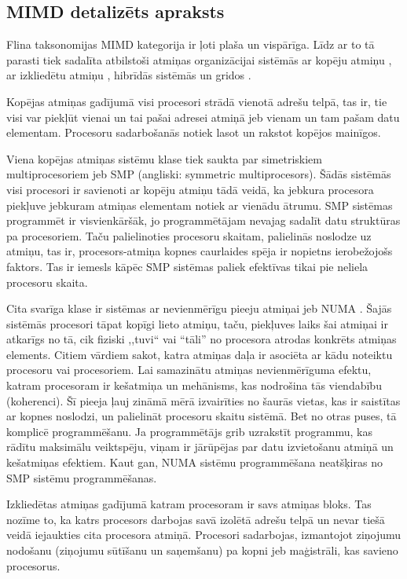 \subsection{MIMD detalizēts apraksts}
Flina taksonomijas MIMD kategorija ir ļoti plaša un vispārīga. Līdz ar to tā
parasti tiek sadalīta atbilstoši atmiņas organizācijai sistēmās ar kopēju atmiņu
, ar izkliedētu atmiņu , hibrīdās
sistēmās un gridos \cite{IntParComp, PatParProg}.

Kopējas atmiņas gadījumā visi procesori strādā vienotā adrešu telpā, tas ir, tie
visi var piekļūt vienai un tai pašai adresei atmiņā jeb vienam un tam pašam datu
elementam. Procesoru sadarbošanās notiek lasot un rakstot kopējos mainīgos.

Viena kopējas atmiņas sistēmu klase tiek saukta par simetriskiem multiprocesoriem
jeb SMP (angliski: symmetric multiprocesors). Šādās sistēmās visi procesori ir
savienoti ar kopēju atmiņu tādā veidā, ka jebkura procesora piekļuve jebkuram
atmiņas elementam notiek ar vienādu ātrumu. SMP sistēmas programmēt ir visvienkāršāk,
jo programmētājam nevajag sadalīt datu struktūras pa procesoriem. Taču palielinoties
procesoru skaitam, palielinās noslodze uz atmiņu, tas ir, procesors-atmiņa kopnes
caurlaides spēja ir nopietns ierobežojošs faktors. Tas ir iemesls kāpēc SMP sistēmas
paliek efektīvas tikai pie neliela procesoru skaita.

Cita svarīga klase ir sistēmas ar nevienmērīgu pieeju atmiņai jeb NUMA . Šajās sistēmās procesori tāpat kopīgi lieto atmiņu, taču,
piekļuves laiks šai atmiņai ir atkarīgs no tā, cik fiziski ,,tuvi`` vai “tāli” no
procesora atrodas konkrēts atmiņas elements. Citiem vārdiem sakot, katra atmiņas
daļa ir asociēta ar kādu noteiktu procesoru vai procesoriem. Lai samazinātu atmiņas
nevienmērīguma efektu, katram procesoram ir kešatmiņa un mehānisms, kas nodrošina
tās viendabību (koherenci). Šī pieeja ļauj zināmā mērā izvairīties no šaurās vietas,
kas ir saistītas ar kopnes noslodzi, un palielināt procesoru skaitu sistēmā. Bet
no otras puses, tā komplicē programmēšanu. Ja programmētājs grib uzrakstīt programmu,
kas rādītu maksimālu veiktspēju, viņam ir jārūpējas par datu izvietošanu atmiņā
un kešatmiņas efektiem. Kaut gan, NUMA sistēmu programmēšana neatšķiras no SMP
sistēmu programmēšanas.

Izkliedētas atmiņas gadījumā katram procesoram ir savs atmiņas bloks. Tas nozīme
to, ka katrs procesors darbojas savā izolētā adrešu telpā un nevar tiešā veidā
iejaukties cita procesora atmiņā. Procesori sadarbojas, izmantojot ziņojumu nodošanu
(ziņojumu sūtīšanu un saņemšanu) pa kopni jeb maģistrāli, kas savieno procesorus.

